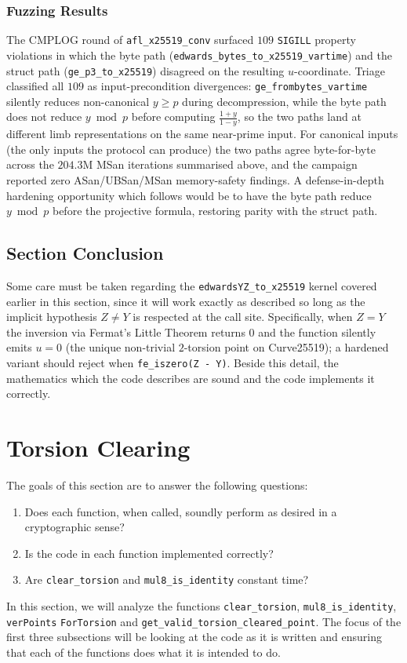 \documentclass[12pt,titlepage,table]{article}
\begin{document}
\subsubsection{Fuzzing Results}
The CMPLOG round of \verb+afl_x25519_conv+ surfaced $109$ \verb+SIGILL+ property violations in which the byte path (\verb+edwards_bytes_to_x25519_vartime+) and the struct path (\verb+ge_p3_to_x25519+) disagreed on the resulting $u$-coordinate.  Triage classified all $109$ as input-precondition divergences: \verb+ge_frombytes_vartime+ silently reduces non-canonical $y \geq p$ during decompression, while the byte path does not reduce $y \bmod p$ before computing $\frac{1+y}{1-y}$, so the two paths land at different limb representations on the same near-prime input. For canonical inputs (the only inputs the protocol can produce) the two paths agree byte-for-byte across the $204.3$M MSan iterations summarised above, and the campaign reported zero ASan/UBSan/MSan memory-safety findings. A defense-in-depth hardening opportunity which follows would be to have the byte path reduce $y \bmod p$ before the projective formula, restoring parity with the struct path.

\subsection[Section Conclusion]{Section Conclusion \hfill \checkmarky}
Some care must be taken regarding the \verb+edwardsYZ_to_x25519+ kernel covered earlier in this section, since it will work exactly as described so long as the implicit hypothesis $Z \neq Y$ is respected at the call site.  Specifically, when $Z = Y$ the inversion via Fermat's Little Theorem returns $0$ and the function silently emits $u = 0$ (the unique non-trivial $2$-torsion point on Curve25519); a hardened variant should reject when \verb+fe_iszero(Z - Y)+.  Beside this detail, the mathematics which the code describes are sound and the code implements it correctly.

\newpage
\section{Torsion Clearing}
The goals of this section are to answer the following questions:
\begin{enumerate}
\item Does each function, when called, soundly perform as desired in a cryptographic sense?
\item Is the code in each function implemented correctly?
\item Are \verb+clear_torsion+ and \verb+mul8_is_identity+ constant time?
\end{enumerate}
In this section, we will analyze the functions \verb+clear_torsion+, \verb+mul8_is_identity+,  \verb+verPoints+ \verb+ForTorsion+ and \verb+get_valid_torsion_cleared_point+. The focus of the first three subsections will be looking at the code as it is written and ensuring that each of the functions does what it is intended to do.
\end{document}
